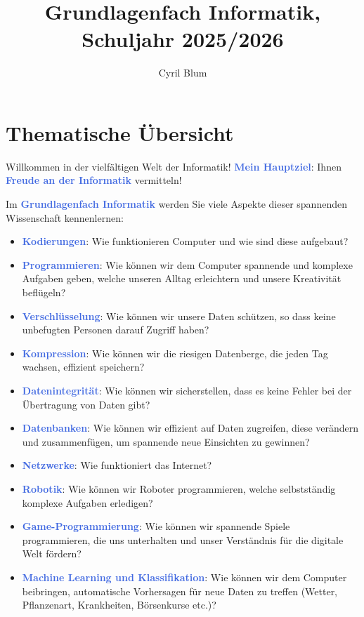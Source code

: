 \let\oldtextbf\textbf

\renewcommand{\textbf}[1]{\oldtextbf{\textcolor{RoyalBlue}{#1}}}

\title{Grundlagenfach Informatik, Schuljahr 2025/2026}
\author{Cyril Blum}




\maketitle

\section*{Thematische Übersicht}
Willkommen in der vielfältigen Welt der Informatik! \textbf{Mein Hauptziel}: Ihnen \textbf{Freude an der Informatik} vermitteln! 

Im \textbf{Grundlagenfach Informatik} werden Sie viele Aspekte dieser spannenden Wissenschaft kennenlernen:

\begin{itemize}
	\item \textbf{Kodierungen}: Wie funktionieren Computer und wie sind diese aufgebaut?
	\item \textbf{Programmieren}: Wie können wir dem Computer spannende und komplexe Aufgaben geben, welche unseren Alltag erleichtern und unsere Kreativität beflügeln?
	\item \textbf{Verschlüsselung}: Wie können wir unsere Daten schützen, so dass keine unbefugten Personen darauf Zugriff haben?
	\item \textbf{Kompression}: Wie können wir die riesigen Datenberge, die jeden Tag wachsen, effizient speichern?
	\item \textbf{Datenintegrität}: Wie können wir sicherstellen, dass es keine Fehler bei der Übertragung von Daten gibt?
	\item \textbf{Datenbanken}: Wie können wir effizient auf Daten zugreifen, diese verändern und zusammenfügen, um spannende neue Einsichten zu gewinnen?
	\item \textbf{Netzwerke}: Wie funktioniert das Internet?
	\item \textbf{Robotik}: Wie können wir Roboter programmieren, welche selbstständig komplexe Aufgaben erledigen?
	\item \textbf{Game-Programmierung}: Wie können wir spannende Spiele programmieren, die uns unterhalten und unser Verständnis für die digitale Welt fördern?
	\item \textbf{Machine Learning und Klassifikation}: Wie können wir dem Computer beibringen, automatische Vorhersagen für neue Daten zu treffen (Wetter, Pflanzenart, Krankheiten, Börsenkurse etc.)?
\end{itemize}

